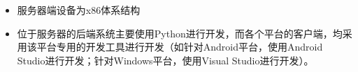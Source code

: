 \begin{itemize}
	\item 服务器端设备为x86体系结构
	\item 位于服务器的后端系统主要使用Python进行开发，而各个平台的客户端，均采用该平台专用的开发工具进行开发（如针对Android平台，使用Android Studio进行开发；针对Windows平台，使用Visual Studio进行开发）。
\end{itemize}